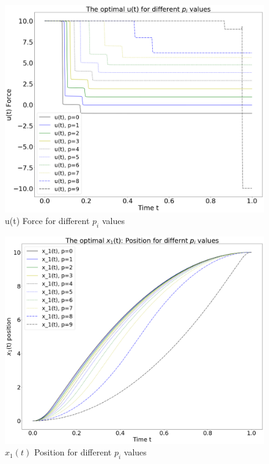 \documentclass  [
  paper    = a4,
  BCOR     = 10mm,
  twoside,
  fontsize = 12pt,
  fleqn,
  toc      = bibnumbered,
  toc      = listofnumbered,
  numbers  = noendperiod,
  headings = normal,
  listof   = leveldown,
  version  = 3.03
]                                       {scrreprt}
\newcommand{\<}{\langle}
\renewcommand{\>}{\rangle}
\begin{document}
\begin{figure}[H]
	\centerline{\includegraphics[width=13cm]{ca_ut_pis.png}}
	\caption{u(t) Force for different $p_i$ values}
	\label{fig_ca_ut_pis}
\end{figure}

\begin{figure}[H]
	\centerline{\includegraphics[width=13cm]{ca_st_pis.png}}
	\caption{$x_1(t)$ Position for different $p_i$ values}
	\label{fig_ca_st_pis}
\end{figure}
\end{document}
